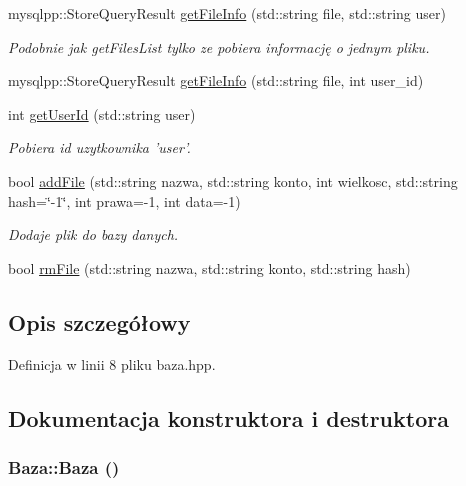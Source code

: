 \begin{CompactItemize}
mysqlpp::StoreQueryResult \hyperlink{a00001_e4a033a65cb585aa91c15fd8b8fde764}{getFileInfo} (std::string file, std::string user)
\begin{CompactList}\small\item\em Podobnie jak getFilesList tylko ze pobiera informację o jednym pliku. \item\end{CompactList}\item 
mysqlpp::StoreQueryResult \hyperlink{a00001_1d1cfca062ab3117b2b97281df012823}{getFileInfo} (std::string file, int user\_\-id)
\item 
int \hyperlink{a00001_65054f08c8fd7c600f6c2fe2c7f61a43}{getUserId} (std::string user)
\begin{CompactList}\small\item\em Pobiera id uzytkownika 'user'. \item\end{CompactList}\item 
bool \hyperlink{a00001_abbda65be49dfb28b1a578d0383599fa}{addFile} (std::string nazwa, std::string konto, int wielkosc, std::string hash=\char`\"{}-1\char`\"{}, int prawa=-1, int data=-1)
\begin{CompactList}\small\item\em Dodaje plik do bazy danych. \item\end{CompactList}\item 
bool \hyperlink{a00001_7161c573401166cc5f7d98ae6f335b44}{rmFile} (std::string nazwa, std::string konto, std::string hash)
\end{CompactItemize}


\subsection{Opis szczegółowy}


Definicja w linii 8 pliku baza.hpp.

\subsection{Dokumentacja konstruktora i destruktora}
\hypertarget{a00001_8edd83a7fa98b203a1ab58157a1660a4}{
\subsubsection[{Baza}]{\setlength{\rightskip}{0pt plus 5cm}Baza::Baza ()}}
\label{a00001_8edd83a7fa98b203a1ab58157a1660a4}


